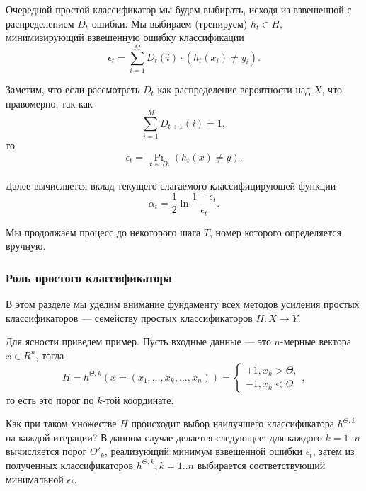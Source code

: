 Очередной простой классификатор мы будем выбирать, исходя из взвешенной с распределением $D_t$ ошибки. Мы выбираем (тренируем) $h_t \in H$, минимизирующий взвешенную ошибку классификации
\begin{displaymath}
  \epsilon_t = \sum_{i = 1}^M{D_t(i) \cdot (h_t(x_i) \neq y_i)}.
\end{displaymath}

Заметим, что если рассмотреть $D_t$ как распределение вероятности над $X$, что правомерно, так как
\begin{displaymath}
  \sum_{i = 1}^M{D_{t + 1}(i)} = 1,
\end{displaymath}
то
\begin{displaymath}
  \epsilon_t = \underset{x \sim D_t}{\Pr}(h_t(x) \neq y).
\end{displaymath}

Далее вычисляется вклад текущего слагаемого классифицирующей функции
\begin{displaymath}
  \alpha_t = \frac{1}{2}\ln{\frac{1 - \epsilon_t}{\epsilon_t}}.
\end{displaymath}

Мы продолжаем процесс до некоторого шага $T$, номер которого определяется вручную.

\subsubsection{Роль простого классификатора}
В этом разделе мы уделим внимание фундаменту всех методов усиления простых классификаторов --- семейству простых классификаторов $H : X \to Y$.

Для ясности приведем пример. Пусть входные данные --- это $n$-мерные вектора $x \in R^n$, тогда
\begin{displaymath}
  H = h^{\Theta, k}(x = (x_1, \dots, x_k, \dots, x_n)) = \begin{cases}+1, x_k > \Theta,\\ -1, x_k < \Theta\end{cases},
\end{displaymath}
то есть это порог по $k$-той координате.

Как при таком множестве $H$ происходит выбор наилучшего классификатора $h^{\Theta, k}$ на каждой итерации? В данном случае делается следующее: для каждого $k = 1..n$ вычисляется порог $\Theta'_k$, реализующий минимум взвешенной ошибки $\epsilon_t$, затем из полученных классификаторов $h^{\Theta, k}, k = 1..n$ выбирается соответствующий минимальной $\epsilon_t$.

